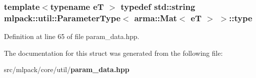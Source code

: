 \subsubsection[{type}]{\setlength{\rightskip}{0pt plus 5cm}template$<$typename eT $>$ typedef {\bf std\+::string} {\bf mlpack\+::util\+::\+Parameter\+Type}$<$ arma\+::\+Mat$<$ eT $>$ $>$\+::{\bf type}}\label{structmlpack_1_1util_1_1ParameterType_3_01arma_1_1Mat_3_01eT_01_4_01_4_a65f820f99e885681db98c4cc4e9e9b54}


Definition at line 65 of file param\+\_\+data.\+hpp.



The documentation for this struct was generated from the following file\+:\begin{DoxyCompactItemize}
\item 
src/mlpack/core/util/{\bf param\+\_\+data.\+hpp}\end{DoxyCompactItemize}

